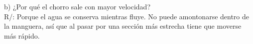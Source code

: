 \documentclass[a4paper, 11pt]{article}
\newcommand{\Aspace}{0.2cm}
\begin{document}
\begin{enumerate}
            \vspace{\Aspace} \par
            b) ¿Por qué el chorro sale con mayor velocidad?
            \\ { \color{azul} R/: Porque el agua se conserva mientras fluye. No puede amontonarse dentro de la manguera, así que al pasar por una sección más estrecha tiene que moverse más rápido.}
    \end{enumerate}
\end{document}
